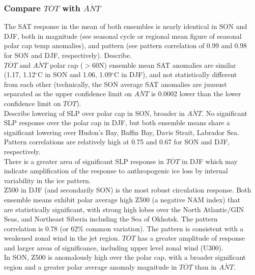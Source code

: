 \documentclass[twocol]{ametsoc}
\begin{document}

\subsubsection{Compare $\overline{TOT}$ with $\overline{ANT}$}

The SAT response in the mean of both ensembles is nearly identical in SON and DJF, both in magnitude (see seasonal cycle or regional mean figure of seasonal polar cap temp anomalies), and pattern (see pattern correlation of 0.99 and 0.98 for SON and DJF, respectively). Describe.\\
$\overline{TOT}$ and $\overline{ANT}$ polar cap ($>$60N) ensemble mean SAT anomalies are similar (1.17, 1.12$^\circ$C in SON and 1.06, 1.09$^\circ$C in DJF), and not statistically different from each other (technically, the SON average SAT anomalies are juuuust separated as the upper confidence limit on $\overline{ANT}$ is 0.0002 lower than the lower confidence limit on $\overline{TOT}$).\\ 

Describe lowering of SLP over polar cap in SON, broader in $\overline{ANT}$. No significant SLP response over the polar cap in DJF, but both ensemble means share a significant lowering over Hudon's Bay, Baffin Bay, Davis Strait, Labrador Sea. Pattern correlations are relatively high at 0.75 and 0.67 for SON and DJF, respectively.\\
There is a greater area of significant SLP response in $\overline{TOT}$ in DJF which may indicate amplification of the response to anthropogenic ice loss by internal variability in the ice pattern.\\
Z500 in DJF (and secondarily SON) is the most robust circulation response. Both ensemble means exhibit polar average high Z500 (a negative NAM index) that are statistically significant, with strong high lobes over the North Atlantic/GIN Seas, and Northeast Siberia including the Sea of Okhotsk. The pattern correlation is 0.78 (or 62\% common variation). The pattern is consistent with a weakened zonal wind in the jet region. $\overline{TOT}$ has a greater amplitude of response and larger areas of significance, including upper level zonal wind (U300). \\
In SON, Z500 is anomalously high over the polar cap, with a broader significant region and a greater polar average anomaly magnitude in $\overline{TOT}$ than in $\overline{ANT}$. \\
\end{document}
